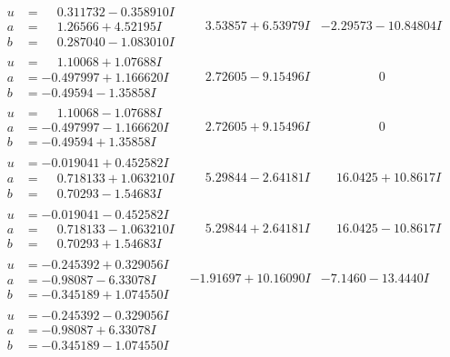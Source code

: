 \documentclass[1p]{elsarticle_modified}
\theoremstyle{definition}
\begin{document}
$$\begin{array}{c|c|c}
\begin{aligned}
u &= \phantom{-}0.311732 - 0.358910 I \\
a &= \phantom{-}1.26566 + 4.52195 I \\
b &= \phantom{-}0.287040 - 1.083010 I\end{aligned}
 & \phantom{-}3.53857 + 6.53979 I & -2.29573 - 10.84804 I \\ \hline\begin{aligned}
u &= \phantom{-}1.10068 + 1.07688 I \\
a &= -0.497997 + 1.166620 I \\
b &= -0.49594 - 1.35858 I\end{aligned}
 & \phantom{-}2.72605 - 9.15496 I & \phantom{-0.000000 } 0 \\ \hline\begin{aligned}
u &= \phantom{-}1.10068 - 1.07688 I \\
a &= -0.497997 - 1.166620 I \\
b &= -0.49594 + 1.35858 I\end{aligned}
 & \phantom{-}2.72605 + 9.15496 I & \phantom{-0.000000 } 0 \\ \hline\begin{aligned}
u &= -0.019041 + 0.452582 I \\
a &= \phantom{-}0.718133 + 1.063210 I \\
b &= \phantom{-}0.70293 - 1.54683 I\end{aligned}
 & \phantom{-}5.29844 - 2.64181 I & \phantom{-}16.0425 + 10.8617 I \\ \hline\begin{aligned}
u &= -0.019041 - 0.452582 I \\
a &= \phantom{-}0.718133 - 1.063210 I \\
b &= \phantom{-}0.70293 + 1.54683 I\end{aligned}
 & \phantom{-}5.29844 + 2.64181 I & \phantom{-}16.0425 - 10.8617 I \\ \hline\begin{aligned}
u &= -0.245392 + 0.329056 I \\
a &= -0.98087 - 6.33078 I \\
b &= -0.345189 + 1.074550 I\end{aligned}
 & -1.91697 + 10.16090 I & -7.1460 - 13.4440 I \\ \hline\begin{aligned}
u &= -0.245392 - 0.329056 I \\
a &= -0.98087 + 6.33078 I \\
b &= -0.345189 - 1.074550 I\end{aligned}

\end{array}$$
\end{document}
